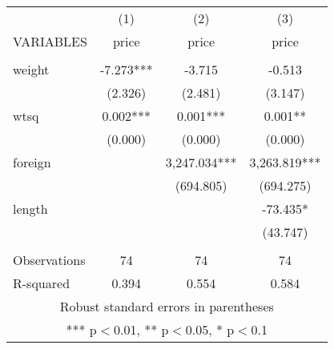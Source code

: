 \begin{tabular}{lccc} \hline
 & (1) & (2) & (3) \\
VARIABLES & price & price & price \\ \hline
 &  &  &  \\
weight & -7.273*** & -3.715 & -0.513 \\
 & (2.326) & (2.481) & (3.147) \\
wtsq & 0.002*** & 0.001*** & 0.001** \\
 & (0.000) & (0.000) & (0.000) \\
foreign &  & 3,247.034*** & 3,263.819*** \\
 &  & (694.805) & (694.275) \\
length &  &  & -73.435* \\
 &  &  & (43.747) \\
 &  &  &  \\
Observations & 74 & 74 & 74 \\
 R-squared & 0.394 & 0.554 & 0.584 \\ \hline
\multicolumn{4}{c}{ Robust standard errors in parentheses} \\
\multicolumn{4}{c}{ *** p$<$0.01, ** p$<$0.05, * p$<$0.1} \\
\end{tabular}
